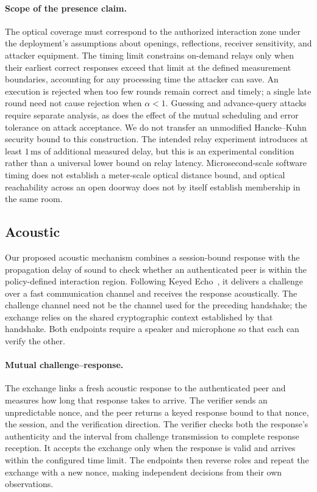 \documentclass[sigconf,authordraft]{acmart}
\begin{document}
\paragraph{Scope of the presence claim.}
The optical coverage must correspond to the authorized interaction zone under the deployment's assumptions about openings, reflections, receiver sensitivity, and attacker equipment.
The timing limit constrains on-demand relays only when their earliest correct responses exceed that limit at the defined measurement boundaries, accounting for any processing time the attacker can save.
An execution is rejected when too few rounds remain correct and timely; a single late round need not cause rejection when $\alpha<1$.
Guessing and advance-query attacks require separate analysis, as does the effect of the mutual scheduling and error tolerance on attack acceptance.
We do not transfer an unmodified Hancke--Kuhn security bound to this construction.
The intended relay experiment introduces at least $1\,\mathrm{ms}$ of additional measured delay, but this is an experimental condition rather than a universal lower bound on relay latency.
Microsecond-scale software timing does not establish a meter-scale optical distance bound, and optical reachability across an open doorway does not by itself establish membership in the same room.

\subsection{Acoustic}
\label{sec:mechanism-acoustic}

Our proposed acoustic mechanism combines a session-bound response with the propagation delay of sound to check whether an authenticated peer is within the policy-defined interaction region.
Following Keyed Echo~\cite{sastry2003secure}, it delivers a challenge over a fast communication channel and receives the response acoustically.
The challenge channel need not be the channel used for the preceding handshake; the exchange relies on the shared cryptographic context established by that handshake.
Both endpoints require a speaker and microphone so that each can verify the other.

\paragraph{Mutual challenge--response.}
The exchange links a fresh acoustic response to the authenticated peer and measures how long that response takes to arrive.
The verifier sends an unpredictable nonce, and the peer returns a keyed response bound to that nonce, the session, and the verification direction.
The verifier checks both the response's authenticity and the interval from challenge transmission to complete response reception.
It accepts the exchange only when the response is valid and arrives within the configured time limit.
The endpoints then reverse roles and repeat the exchange with a new nonce, making independent decisions from their own observations.
\end{document}
